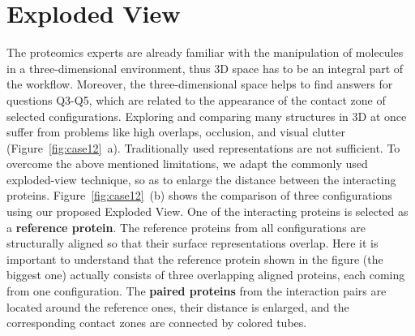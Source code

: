 \documentclass[twocolumn]{bmcart}%
\def\ExpView {Exploded View\xspace}
\begin{document}
\section{Exploded View}
The proteomics experts are already familiar with the manipulation of molecules in a three-dimensional environment, thus 3D space has to be an integral part of the workflow.
Moreover, the three-dimensional space helps to find answers for questions Q3-Q5, which are related to the appearance of the contact zone of selected configurations.
Exploring and comparing many structures in 3D at once suffer from problems like high overlaps, occlusion, and visual clutter (Figure~\ref{fig:case12}~a). 
Traditionally used representations are not sufficient.
To overcome the above mentioned limitations, we adapt the commonly used exploded-view technique, so as to enlarge the distance between the interacting proteins. 
Figure~\ref{fig:case12}~(b) shows the comparison of three configurations using our proposed \ExpView.
One of the interacting proteins is selected as a \textbf{reference protein}.
The reference proteins from all configurations are structurally aligned so that their surface representations overlap. 
Here it is important to understand that the reference protein shown in the figure (the biggest one) actually consists of three overlapping aligned proteins, each coming from one configuration.
The \textbf{paired proteins} from the interaction pairs are located around the reference ones, their distance is enlarged, and the corresponding contact zones are connected by colored tubes. 
\end{document}
